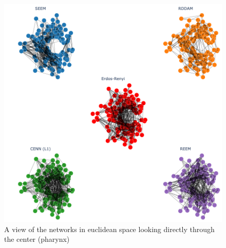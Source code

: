 \begin{figure}[h]
  \centering
  \includegraphics[width=\linewidth]{../data/images/3D/all1_middle.png}
  \caption{A view of the networks in euclidean space looking directly through the center (pharynx) }
\end{figure}
